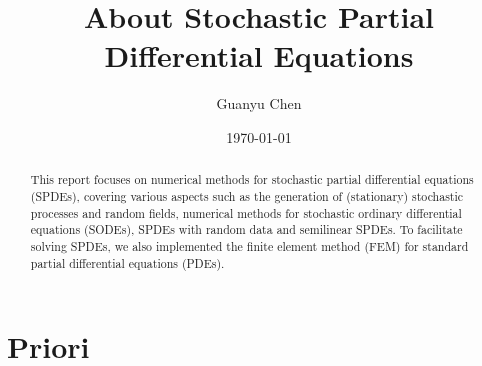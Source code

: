 \documentclass{article}
\title{About Stochastic Partial Differential Equations}
\author{Guanyu Chen}
\date{\today}
\begin{document}
\maketitle
\begin{abstract}
    This report focuses on numerical methods for stochastic partial differential equations (SPDEs), covering various aspects such as the generation of (stationary) stochastic processes and random fields, numerical methods for stochastic ordinary differential equations (SODEs), SPDEs with random data and semilinear SPDEs. 
    To facilitate solving SPDEs, we also implemented the finite element method (FEM) for standard partial differential equations (PDEs). 
\end{abstract}
\tableofcontents
\newpage
\section{Priori}
\end{document}

